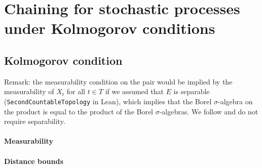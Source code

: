 










\section{Chaining for stochastic processes under Kolmogorov conditions}

\subsection{Kolmogorov condition}


Remark: the measurability condition on the pair would be implied by the measurability of $X_t$ for all $t \in T$ if we assumed that $E$ is separable (\texttt{SecondCountableTopology} in Lean), which implies that the Borel $\sigma$-algebra on the product is equal to the product of the Borel $\sigma$-algebras.
We follow \cite{kratschmer2023kolmogorov} and do not require separability.










\paragraph{Measurability}












\paragraph{Distance bounds}





